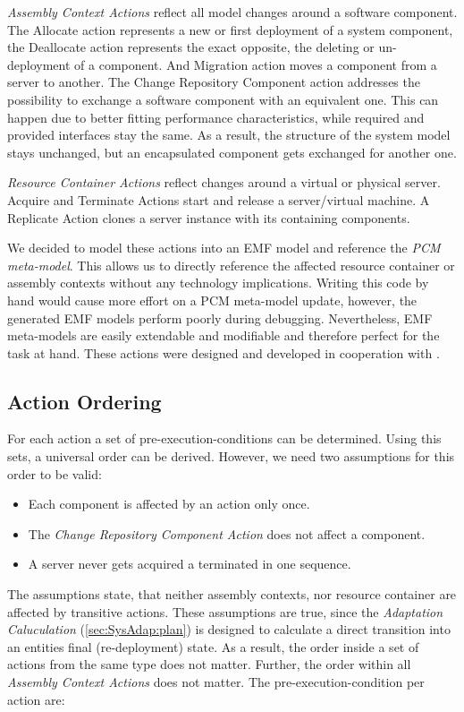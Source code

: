 \textit{Assembly Context Actions} reflect all model changes around a software component. The Allocate action represents a new or first deployment of a system component, the Deallocate action represents the exact opposite, the deleting or un-deployment of a component. And Migration action moves a component from a server to another. The Change Repository Component action addresses the possibility to exchange a software component with an equivalent one. This can happen due to better fitting performance characteristics, while required and provided interfaces stay the same. As a result, the structure of the system model stays unchanged, but an encapsulated component gets exchanged for another one.

\textit{Resource Container Actions} reflect changes around a virtual or physical server. Acquire and Terminate Actions start and release a server/virtual machine. A Replicate Action clones a server instance with its containing components.

We decided to model these actions into an EMF model and reference the \textit{PCM meta-model}. This allows us to directly reference the affected resource container or assembly contexts without any technology implications. Writing this code by hand would cause more effort on a PCM meta-model update, however, the generated EMF models perform poorly during debugging. Nevertheless, EMF meta-models are easily extendable and modifiable and therefore perfect for the task at hand. These actions were designed and developed in cooperation with \cite{TobiasPoppke.20170626}.

\subsection{Action Ordering}

For each action a set of pre-execution-conditions can be determined. Using this sets, a universal order can be derived. However, we need two assumptions for this order to be valid:
\begin{itemize}
	\setlength\itemsep{0em}
	\item Each component is affected by an action only once. 
	\item The \textit{Change Repository Component Action} does not affect a component.
	\item A server never gets acquired a terminated in one sequence.
\end{itemize}

The assumptions state, that neither assembly contexts, nor resource container are affected by transitive actions. These assumptions are true, since the \textit{Adaptation Caluculation} (\autoref{sec:SysAdap:plan}) is designed to calculate a direct transition into an entities final (re-deployment) state. As a result, the order inside a set of actions from the same type does not matter. Further, the order within all \textit{Assembly Context Actions} does not matter. The pre-execution-condition per action are:

